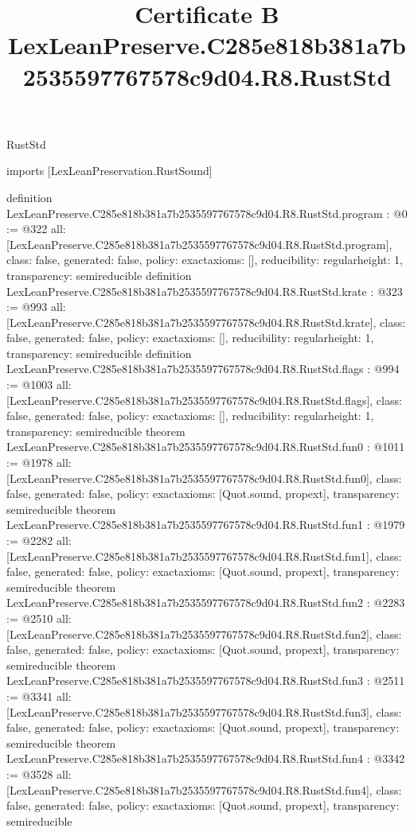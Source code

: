 \begin{lexlean}{RustStd}
\title{Certificate B LexLeanPreserve.C285e818b381a7b2535597767578c9d04.R8.RustStd}
\begin{coremodule}
imports [LexLeanPreservation.RustSound]

definition LexLeanPreserve.C285e818b381a7b2535597767578c9d04.R8.RustStd.program : @0 := @322 {
  all: [LexLeanPreserve.C285e818b381a7b2535597767578c9d04.R8.RustStd.program],
  class: false,
  generated: false,
  policy: exact{axioms: []},
  reducibility: regular{height: 1},
  transparency: semireducible
}
definition LexLeanPreserve.C285e818b381a7b2535597767578c9d04.R8.RustStd.krate : @323 := @993 {
  all: [LexLeanPreserve.C285e818b381a7b2535597767578c9d04.R8.RustStd.krate],
  class: false,
  generated: false,
  policy: exact{axioms: []},
  reducibility: regular{height: 1},
  transparency: semireducible
}
definition LexLeanPreserve.C285e818b381a7b2535597767578c9d04.R8.RustStd.flags : @994 := @1003 {
  all: [LexLeanPreserve.C285e818b381a7b2535597767578c9d04.R8.RustStd.flags],
  class: false,
  generated: false,
  policy: exact{axioms: []},
  reducibility: regular{height: 1},
  transparency: semireducible
}
theorem LexLeanPreserve.C285e818b381a7b2535597767578c9d04.R8.RustStd.fun0 : @1011 := @1978 {
  all: [LexLeanPreserve.C285e818b381a7b2535597767578c9d04.R8.RustStd.fun0],
  class: false,
  generated: false,
  policy: exact{axioms: [Quot.sound, propext]},
  transparency: semireducible
}
theorem LexLeanPreserve.C285e818b381a7b2535597767578c9d04.R8.RustStd.fun1 : @1979 := @2282 {
  all: [LexLeanPreserve.C285e818b381a7b2535597767578c9d04.R8.RustStd.fun1],
  class: false,
  generated: false,
  policy: exact{axioms: [Quot.sound, propext]},
  transparency: semireducible
}
theorem LexLeanPreserve.C285e818b381a7b2535597767578c9d04.R8.RustStd.fun2 : @2283 := @2510 {
  all: [LexLeanPreserve.C285e818b381a7b2535597767578c9d04.R8.RustStd.fun2],
  class: false,
  generated: false,
  policy: exact{axioms: [Quot.sound, propext]},
  transparency: semireducible
}
theorem LexLeanPreserve.C285e818b381a7b2535597767578c9d04.R8.RustStd.fun3 : @2511 := @3341 {
  all: [LexLeanPreserve.C285e818b381a7b2535597767578c9d04.R8.RustStd.fun3],
  class: false,
  generated: false,
  policy: exact{axioms: [Quot.sound, propext]},
  transparency: semireducible
}
theorem LexLeanPreserve.C285e818b381a7b2535597767578c9d04.R8.RustStd.fun4 : @3342 := @3528 {
  all: [LexLeanPreserve.C285e818b381a7b2535597767578c9d04.R8.RustStd.fun4],
  class: false,
  generated: false,
  policy: exact{axioms: [Quot.sound, propext]},
  transparency: semireducible
}
\end{coremodule}
\end{lexlean}

